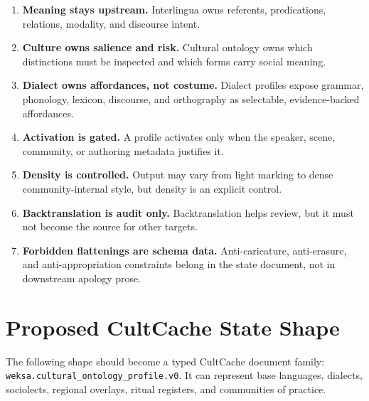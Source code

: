 \documentclass[11pt]{article}
\begin{document}
\begin{enumerate}
  \item \textbf{Meaning stays upstream.} Interlingua owns referents,
  predications, relations, modality, and discourse intent.
  \item \textbf{Culture owns salience and risk.} Cultural ontology owns which
  distinctions must be inspected and which forms carry social meaning.
  \item \textbf{Dialect owns affordances, not costume.} Dialect profiles expose
  grammar, phonology, lexicon, discourse, and orthography as selectable,
  evidence-backed affordances.
  \item \textbf{Activation is gated.} A profile activates only when the speaker,
  scene, community, or authoring metadata justifies it.
  \item \textbf{Density is controlled.} Output may vary from light marking to
  dense community-internal style, but density is an explicit control.
  \item \textbf{Backtranslation is audit only.} Backtranslation helps review,
  but it must not become the source for other targets.
  \item \textbf{Forbidden flattenings are schema data.} Anti-caricature,
  anti-erasure, and anti-appropriation constraints belong in the state document,
  not in downstream apology prose.
\end{enumerate}

\section{Proposed CultCache State Shape}

The following shape should become a typed CultCache document family:
\texttt{weksa.cultural\_ontology\_profile.v0}. It can represent base languages,
dialects, sociolects, regional overlays, ritual registers, and communities of
practice.
\end{document}
